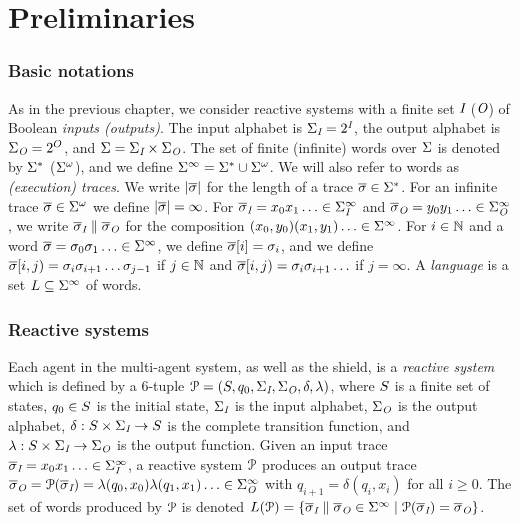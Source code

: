 \section{Preliminaries}
\label{sec_prel}

\subsubsection*{Basic notations}
As in the previous chapter, we consider reactive systems with a finite set
$\textit{I}$ ($\textit{O}$) of Boolean \emph{inputs (outputs)}.
The input alphabet is
$\Sigma_{\textit{I}}=2^{\textit{I}}$, the output alphabet is $\Sigma_{\textit{O}}=2^O$, and
$\Sigma=\Sigma_{\textit{I}} \times \Sigma_{\textit{O}}$. The set of finite (infinite) words
over $\Sigma$ is denoted by $\Sigma^*$ ($\Sigma^\omega$), and
we define $\Sigma^{\infty} = \Sigma^* \cup \Sigma^\omega$.  We will also refer
to words as \emph{(execution) traces}.  We write $|\overline\sigma|$ for the
length of a trace $\overline\sigma\in \Sigma^*$. For an infinite trace $\overline\sigma\in \Sigma^\omega$ we define $|\overline\sigma| =\infty$. For $\overline\sigma_{\textit{I}} = x_0
x_1 \ldots \in \Sigma_{\textit{I}}^\infty$ and $\overline\sigma_{\textit{O}} = y_0 y_1 \ldots \in
\Sigma_{\textit{O}}^\infty$, we write $\overline\sigma_{\textit{I}} \parallel \overline\sigma_{\textit{O}}$ for the
composition $(x_0,y_0) (x_1,y_1) \ldots \in \Sigma^\infty$.
For $i \in \mathbb{N}$ and a word $\overline\sigma = \sigma_0\sigma_1\ldots \in \Sigma^\infty$, we define $\overline\sigma[i] = \sigma_i$, and we define $\overline\sigma[i,j) = \sigma_i\sigma_{i+1}\ldots\sigma_{j-1}$ if $j \in \mathbb{N}$ and $\overline\sigma[i,j) = \sigma_i\sigma_{i+1}\ldots$ if $j = \infty$.
A \emph{language} is a set $L
\subseteq  \Sigma^\infty$ of words.


\subsubsection*{Reactive systems}

Each agent in the multi-agent system, as well as the shield, is a \emph{reactive system} which is defined by a
6-tuple $\mathcal{P} = (S,q_{0},\Sigma_{\textit{I}},\Sigma_{\textit{O}},\delta,\lambda)$,
where
$S$ is a finite set of states,
$q_{0} \in S$ is the initial state,
$\Sigma_{\textit{I}}$ is the input alphabet,
$\Sigma_{\textit{O}}$ is the output alphabet,
$\delta: S \times \Sigma_{\textit{I}} \to S$ is the complete transition function, and $\lambda : S \times \Sigma_{\textit{I}} \to \Sigma_{\textit{O}}$ is the output function.
%
Given an input trace $\overline\sigma_{\textit{I}} = x_0 x_1 \ldots \in \Sigma_{\textit{I}}^\infty$, a reactive system $\mathcal{\mathcal{P}}$ produces an
output trace $\overline\sigma_{\textit{O}} = \mathcal{\mathcal{P}}(\overline\sigma_{\textit{I}}) = \lambda(q_0, x_0)
\lambda(q_1, x_1) \ldots \in \Sigma_{\textit{O}}^\infty$ with $q_{i+1} = \delta(q_i, x_i)$ for all $i \ge 0$.
The set of words produced by
$\mathcal{\mathcal{P}}$ is denoted $L(\mathcal{\mathcal{P}}) = \{\overline\sigma_{\textit{I}} \parallel \overline\sigma_{\textit{O}} \in
\Sigma^\infty \mid \mathcal{\mathcal{P}}(\overline\sigma_{\textit{I}}) = \overline\sigma_{\textit{O}}\}$.

